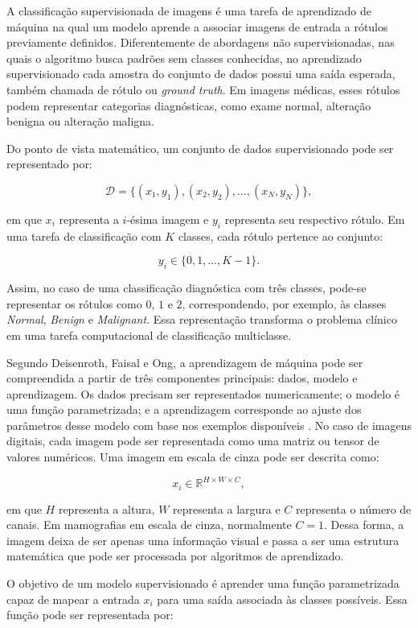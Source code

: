 \documentclass[
    12pt,
    openright,
    oneside,
    a4paper,
    english,
    brazil
]{abntex2}
\begin{document}
A classificação supervisionada de imagens é uma tarefa de aprendizado de máquina na qual um modelo aprende a associar imagens de entrada a rótulos previamente definidos. Diferentemente de abordagens não supervisionadas, nas quais o algoritmo busca padrões sem classes conhecidas, no aprendizado supervisionado cada amostra do conjunto de dados possui uma saída esperada, também chamada de rótulo ou \textit{ground truth}. Em imagens médicas, esses rótulos podem representar categorias diagnósticas, como exame normal, alteração benigna ou alteração maligna.

Do ponto de vista matemático, um conjunto de dados supervisionado pode ser representado por:

\[
\mathcal{D} =
\{(x_1,y_1),(x_2,y_2),\ldots,(x_N,y_N)\},
\]

em que \(x_i\) representa a \(i\)-ésima imagem e \(y_i\) representa seu respectivo rótulo. Em uma tarefa de classificação com \(K\) classes, cada rótulo pertence ao conjunto:

\[
y_i \in \{0,1,\ldots,K-1\}.
\]

Assim, no caso de uma classificação diagnóstica com três classes, pode-se representar os rótulos como \(0\), \(1\) e \(2\), correspondendo, por exemplo, às classes \textit{Normal}, \textit{Benign} e \textit{Malignant}. Essa representação transforma o problema clínico em uma tarefa computacional de classificação multiclasse.

Segundo Deisenroth, Faisal e Ong, a aprendizagem de máquina pode ser compreendida a partir de três componentes principais: dados, modelo e aprendizagem. Os dados precisam ser representados numericamente; o modelo é uma função parametrizada; e a aprendizagem corresponde ao ajuste dos parâmetros desse modelo com base nos exemplos disponíveis \cite{deisenroth2020mathematics}. No caso de imagens digitais, cada imagem pode ser representada como uma matriz ou tensor de valores numéricos. Uma imagem em escala de cinza pode ser descrita como:

\[
x_i \in \mathbb{R}^{H \times W \times C},
\]

em que \(H\) representa a altura, \(W\) representa a largura e \(C\) representa o número de canais. Em mamografias em escala de cinza, normalmente \(C=1\). Dessa forma, a imagem deixa de ser apenas uma informação visual e passa a ser uma estrutura matemática que pode ser processada por algoritmos de aprendizado.

O objetivo de um modelo supervisionado é aprender uma função parametrizada capaz de mapear a entrada \(x_i\) para uma saída associada às classes possíveis. Essa função pode ser representada por:
\end{document}
